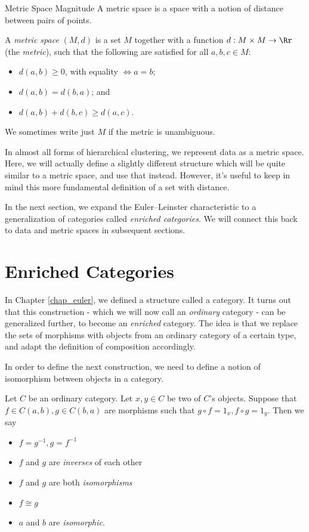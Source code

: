 \documentclass[12pt]{pom_thesis}
\begin{document}
\begin{chapter}{Metric Space Magnitude}
A metric space is a space with a notion of distance between pairs of points. 
\begin{defn}
A \textit{metric space} $(M,d)$ is a set $M$ together with a function  $d:M \times M \rightarrow \Rr$ (the \emph{metric}), such that the following are satisfied for all $a,b,c \in M$:
\begin{itemize}
\item $d(a,b) \geq 0$, with equality $\iff a = b$;
\item $d(a,b) = d(b,a)$; and
\item $d(a,b) + d(b,c) \geq d(a,c)$.
\end{itemize}
We sometimes write just $M$ if the metric is unambiguous.
\end{defn}

In almost all forms of hierarchical clustering, we represent data as a metric space. Here, we will actually define a slightly different structure which will be quite similar to a metric space, and use that instead. However, it's useful to keep in mind this more fundamental definition of a set with distance.

In the next section, we expand the Euler--Leinster characteristic to a generalization of categories called \emph{enriched categories}. We will connect this back to data and metric spaces in subsequent sections.
\section{Enriched Categories}
In Chapter \ref{chap_euler}, we defined a structure called a category. It turns out that this construction - which we will now call an \emph{ordinary} category - can be generalized further, to become an \emph{enriched} category. The idea is that we replace the sets of morphisms with objects from an ordinary category of a certain type, and adapt the definition of composition accordingly. 

In order to define the next construction, we need to define a notion of isomorphism between objects in a category.
\begin{defn}
Let $C$ be an ordinary category. Let $x,y \in C$ be two of $C$'s objects. Suppose that $f \in C(a,b), g \in C(b,a)$ are morphisms such that $g \circ f = 1_x, f \circ g = 1_y$. Then we say
\begin{itemize}
\item $f = g^{-1}, g = f^{-1}$
\item $f$ and $g$ are \emph{inverses} of each other
\item $f$ and $g$ are both \emph{isomorphisms}
\item $f \cong g$
\item $a$ and $b$ are \emph{isomorphic}.
\end{itemize}
\end{defn}


\end{chapter}
\end{document}
